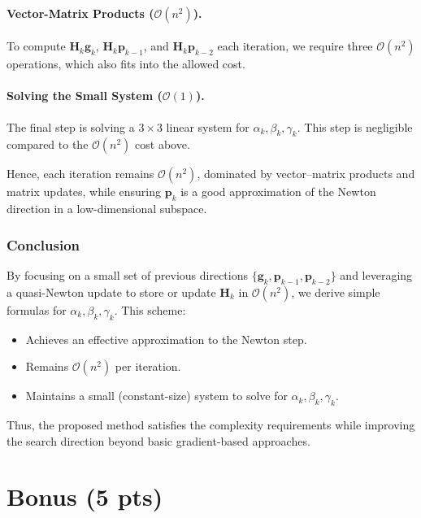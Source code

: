 \documentclass[12pt]{article}
\begin{document}
\paragraph{Vector-Matrix Products (\(\mathcal{O}(n^2)\)).}
To compute \(\mathbf{H}_k \mathbf{g}_k\), \(\mathbf{H}_k \mathbf{p}_{k-1}\), and \(\mathbf{H}_k \mathbf{p}_{k-2}\) each iteration, we require three \(\mathcal{O}(n^2)\) operations, which also fits into the allowed cost.

\paragraph{Solving the Small System (\(\mathcal{O}(1)\)).}
The final step is solving a \(3 \times 3\) linear system for \(\alpha_k, \beta_k, \gamma_k\). This step is negligible compared to the \(\mathcal{O}(n^2)\) cost above.

\bigskip

Hence, each iteration remains \(\mathcal{O}(n^2)\), dominated by vector–matrix products and matrix updates, while ensuring \(\mathbf{p}_k\) is a good approximation of the Newton direction in a low-dimensional subspace.

\subsubsection{Conclusion}

By focusing on a small set of previous directions \(\{ \mathbf{g}_k, \mathbf{p}_{k-1}, \mathbf{p}_{k-2} \}\) and leveraging a quasi-Newton update to store or update \(\mathbf{H}_k\) in \(\mathcal{O}(n^2)\), we derive simple formulas for \(\alpha_k, \beta_k, \gamma_k\). This scheme:
\begin{itemize}
    \item Achieves an effective approximation to the Newton step.
    \item Remains \(\mathcal{O}(n^2)\) per iteration.
    \item Maintains a small (constant-size) system to solve for \(\alpha_k, \beta_k, \gamma_k\).
\end{itemize}
Thus, the proposed method satisfies the complexity requirements while improving the search direction beyond basic gradient-based approaches.

\section*{Bonus (5 pts)}
\end{document}
